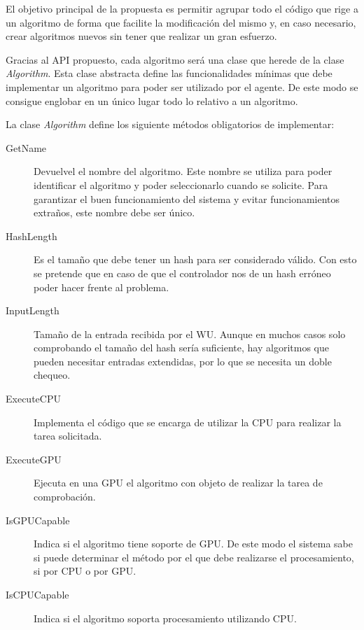 El objetivo principal de la propuesta es permitir agrupar todo el código que rige a un algoritmo de forma que facilite la modificación del mismo y, en caso necesario, crear algoritmos nuevos sin tener que realizar un gran esfuerzo.

Gracias al API propuesto, cada algoritmo será una clase que herede de la clase \emph{Algorithm}. Esta clase abstracta define las funcionalidades mínimas que debe implementar un algoritmo para poder ser utilizado por el agente. De este modo se consigue englobar en un único lugar todo lo relativo a un algoritmo.

La clase \emph{Algorithm} define los siguiente métodos obligatorios de implementar:

\begin{description}
	\item[GetName] Devuelvel el nombre del algoritmo. Este nombre se utiliza para poder identificar el algoritmo y poder seleccionarlo cuando se solicite. Para garantizar el buen funcionamiento del sistema y evitar funcionamientos extraños, este nombre debe ser único.
	
	\item[HashLength] Es el tamaño que debe tener un hash para ser considerado válido. Con esto se pretende que en caso de que el controlador nos de un hash erróneo poder hacer frente al problema.

	\item[InputLength] Tamaño de la entrada recibida por el WU. Aunque en muchos casos solo comprobando el tamaño del hash sería suficiente, hay algoritmos que pueden necesitar entradas extendidas, por lo que se necesita un doble chequeo.

	\item[ExecuteCPU] Implementa el código que se encarga de utilizar la CPU para realizar la tarea solicitada.

	\item[ExecuteGPU] Ejecuta en una GPU el algoritmo con objeto de realizar la tarea de comprobación.
	
	\item[IsGPUCapable] Indica si el algoritmo tiene soporte de GPU. De este modo el sistema sabe si puede determinar el método por el que debe realizarse el procesamiento, si por CPU o por GPU.
	
	\item[IsCPUCapable] Indica si el algoritmo soporta procesamiento utilizando CPU.
\end{description}

